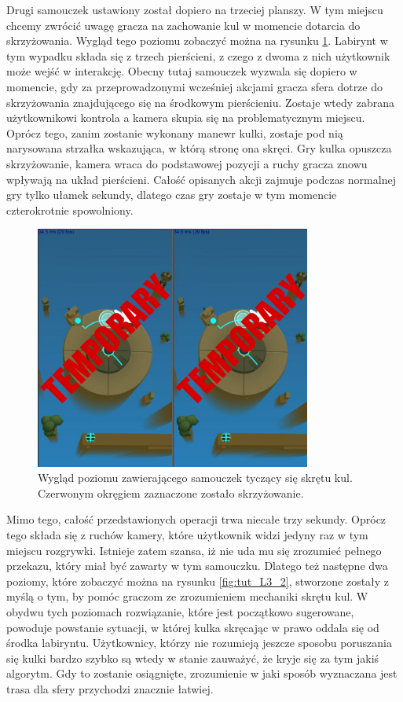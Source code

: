 \documentclass[a4paper,12pt,numbers=noenddot]{report}
\begin{document}
Drugi samouczek ustawiony został dopiero na trzeciej planszy. W tym miejscu chcemy zwrócić uwagę gracza na zachowanie kul w momencie dotarcia do skrzyżowania. Wygląd tego poziomu zobaczyć można na rysunku \ref{fig:tut_L3_1}. Labirynt w tym wypadku składa się z trzech pierścieni, z czego z dwoma z nich użytkownik może wejść w interakcję. Obecny tutaj samouczek wyzwala się dopiero w momencie, gdy za przeprowadzonymi wcześniej akcjami gracza sfera dotrze do skrzyżowania znajdującego się na środkowym pierścieniu. Zostaje wtedy zabrana użytkownikowi kontrola a kamera skupia się na problematycznym miejscu. Oprócz tego, zanim zostanie wykonany manewr kulki, zostaje pod nią narysowana strzałka wskazująca, w którą stronę ona skręci. Gry kulka opuszcza skrzyżowanie, kamera wraca do podstawowej pozycji a ruchy gracza znowu wpływają na układ pierścieni. Całość opisanych akcji zajmuje podczas normalnej gry tylko ułamek sekundy, dlatego czas gry zostaje w tym momencie czterokrotnie spowolniony. 
\begin{figure}[h!]
	\centering
  	\includegraphics[height=8cm]{fig/tmp2.jpg}
	\caption{Wygląd poziomu zawierającego samouczek tyczący się skrętu kul. Czerwonym okręgiem zaznaczone zostało skrzyżowanie.}
	\label{fig:tut_L3_1}
\end{figure}
Mimo tego, całość przedstawionych operacji trwa niecałe trzy sekundy. Oprócz tego składa się z ruchów kamery, które użytkownik widzi jedyny raz w tym miejscu rozgrywki. Istnieje zatem szansa, iż nie uda mu się zrozumieć pełnego przekazu, który miał być zawarty w tym samouczku. Dlatego też następne dwa poziomy, które zobaczyć można na rysunku \ref{fig:tut_L3_2}, stworzone zostały z myślą o tym, by pomóc graczom ze zrozumieniem mechaniki skrętu kul. W obydwu tych poziomach rozwiązanie, które jest początkowo sugerowane, powoduje powstanie sytuacji, w której kulka skręcając w prawo oddala się od środka labiryntu. Użytkownicy, którzy nie rozumieją jeszcze sposobu poruszania się kulki bardzo szybko są wtedy w stanie zauważyć, że kryje się za tym jakiś algorytm. Gdy to zostanie osiągnięte, zrozumienie w jaki sposób wyznaczana jest trasa dla sfery przychodzi znacznie łatwiej.
\end{document}
